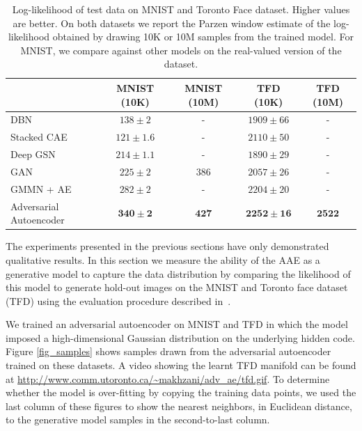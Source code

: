 \documentclass{article}
\begin{document}
\begin{center}
\begin{table}[t]
\small
\centering %
\begin{tabular}{ l  || c || c || c || c}
  \hline
  & MNIST (10K) & MNIST (10M) & TFD (10K) & TFD (10M)\\
  \hline

  DBN \citep{geoff} & $138 \pm 2$ & - & $1909 \pm 66$ & -\\
  Stacked CAE \citep{stacked_cae} & $121 \pm 1.6$ & - & $2110 \pm 50$ & -  \\
  Deep GSN \citep{gsn} & $214 \pm 1.1$ & - & $1890   \pm 29$ & - \\
  GAN \citep{gan} & $225 \pm 2$ & $386$ & $2057 \pm 26$ & -\\
  GMMN + AE \citep{gmmn} & $282 \pm 2$ & - & $2204 \pm 20$ & -\\
  Adversarial Autoencoder & $\mathbf{340} \pm \mathbf{2}$ & $\mathbf{427}$ & $\mathbf{2252} \pm \mathbf{16}$ & $\mathbf{2522}$\\
  \hline
\end{tabular}
\caption{\label{table:table_mnist}Log-likelihood of test data on MNIST and Toronto Face dataset. Higher values are better. On both datasets we report the Parzen window estimate of the log-likelihood obtained by drawing 10K or 10M samples from the trained model. For MNIST, we compare against other models on the real-valued version of the dataset.}
\end{table}
\end{center}

The experiments presented in the previous sections have only demonstrated qualitative results.
In this section we measure the ability of the AAE as a generative model to capture the data distribution by comparing the likelihood of this model to generate hold-out images on the MNIST and Toronto face dataset (TFD) using the evaluation procedure described in~\citep{gan}.

We trained an adversarial autoencoder on MNIST and TFD in which the model imposed a high-dimensional Gaussian distribution on the underlying hidden code.
Figure \ref{fig_samples} shows samples drawn from the adversarial autoencoder trained on these datasets. 
A video showing the learnt TFD manifold can be found at \url{http://www.comm.utoronto.ca/~makhzani/adv_ae/tfd.gif}. 
To determine whether the model is over-fitting by copying the training data points, we used the last column of these figures to show the nearest neighbors, in Euclidean distance, to the generative model samples in the second-to-last column.
\end{document}
